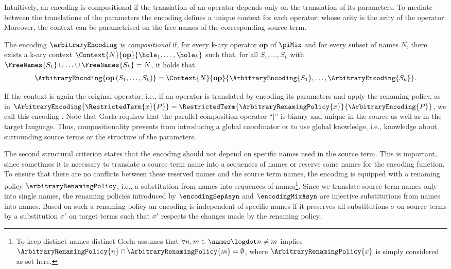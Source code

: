 \documentclass[]{llncs}
\begin{document}
Intuitively, an encoding is compositional if the translation of an operator depends only on the translation of its parameters. To mediate between the translations of the parameters the encoding defines a unique context for each operator, whose arity is the arity of the operator. Moreover, the context can be parametrised on the free names of the corresponding source term.

\begin{definition}
\label{def:compositionality}
	The encoding $ \arbitraryEncoding $ is \emph{compositional} if, for every k-ary operator $ \mathbf{op} $ of $ \piMix $ and for every subset of names $ N $, there exists a k-ary context $ \Context{N}{\mathbf{op}}{\hole_1, \ldots , \hole_k} $ such that, for all $ S_1, \ldots, S_k $ with $ \FreeNames{S_1} \cup \ldots \cup \FreeNames{S_k} = N $, it holds that
	\begin{align*}
		\ArbitraryEncoding{\mathbf{op}\left( S_1, \ldots, S_k \right)} = \Context{N}{\mathbf{op}}{\ArbitraryEncoding{S_1}, \ldots , \ArbitraryEncoding{S_k}}.
	\end{align*}
\end{definition}

\noindent
If the context is again the original operator, i.e., if an operator is translated by encoding its parameters and apply the renaming policy, as in $ \ArbitraryEncoding{\RestrictedTerm{x}{P}} = \RestrictedTerm{\ArbitraryRenamingPolicy{x}}{\ArbitraryEncoding{P}} $, we call this encoding \emph{\clean}. Note that Gorla requires that the parallel composition operator ``$ \mid $'' is binary and unique in the source as well as in the target language. Thus, compositionality prevents from introducing a global coordinator or to use global knowledge, i.e., knowledge about surrounding source terms or the structure of the parameters.

The second structural criterion states that the encoding should not depend on specific names used in the source term. This is important, since sometimes it is necessary to translate a source term name into a sequences of names or reserve some names for the encoding function. To ensure that there are no conflicts between these reserved names and the source term names, the encoding is equipped with a renaming policy $ \arbitraryRenamingPolicy $, i.e., a substitution from names into sequences of names\footnote{To keep distinct names distinct Gorla assumes that $ \forall n, m \in \names \logdot n \neq m $ implies $ \ArbitraryRenamingPolicy{n} \cap \ArbitraryRenamingPolicy{m} = \emptyset $, where $ \ArbitraryRenamingPolicy{x} $ is simply considered as set here.}. Since we translate source term names only into single names, the renaming policies introduced by $ \encodingSepAsyn $ and $ \encodingMixAsyn $ are injective substitutions from names into names. Based on such a renaming policy an encoding is independent of specific names if it preserves all substitutions $ \sigma $ on source terms by a substitution $ \sigma' $ on target terms such that $ \sigma' $ respects the changes made by the renaming policy.
\end{document}
